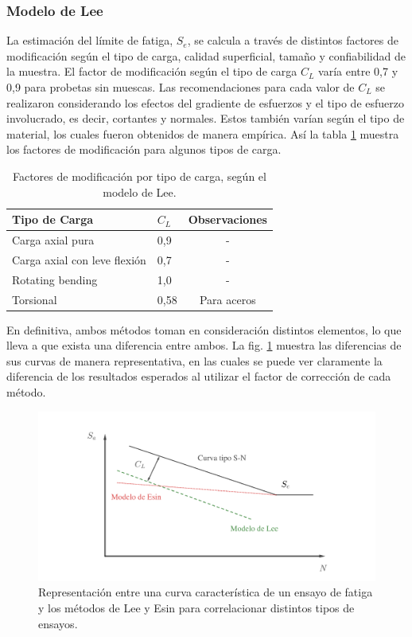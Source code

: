 \subsubsection{Modelo de Lee}
La estimación del límite de fatiga, $S_e$, se calcula a través de distintos factores de modificación según el tipo de carga, calidad superficial, tamaño y confiabilidad de la muestra. El factor de modificación según el tipo de carga $C_L$ varía entre 0,7 y 0,9 para probetas sin muescas. Las recomendaciones para cada valor de $C_L$ se realizaron considerando los efectos del gradiente de esfuerzos y el tipo de esfuerzo involucrado, es decir, cortantes y normales. Estos también varían según el tipo de material, los cuales fueron obtenidos de manera empírica. Así la tabla \ref{tab:lee_factor} muestra los factores de modificación para algunos tipos de carga.

\begin{table}[h]
\centering
\begin{tabular}{@{}llc@{}}
\toprule
Tipo de Carga                & $C_L$ & Observaciones \\ \midrule
Carga axial pura             & 0,9   & -                                 \\
Carga axial con leve flexión & 0,7   & -                                 \\
Rotating bending             & 1,0   & -                                 \\
Torsional                    & 0,58  & Para aceros   \\ \bottomrule
\end{tabular}
\caption{Factores de modificación por tipo de carga, según el modelo de Lee.}
\label{tab:lee_factor}
\end{table}

En definitiva, ambos métodos toman en consideración distintos elementos, lo que lleva a que exista una diferencia entre ambos. La fig. \ref{fig:comp_modfat} muestra las diferencias de sus curvas de manera representativa, en las cuales se puede ver claramente la diferencia de los resultados esperados al utilizar el factor de corrección de cada método.

\begin{figure}[h]
\centering
\includegraphics[width=1\linewidth, trim={6cm 1cm 5cm 2cm}, clip]{Imagenes/comp_modfat.pdf}
\caption{Representación entre una curva característica de un ensayo de fatiga y los métodos de Lee y Esin para correlacionar distintos tipos de ensayos. \cite{strzelecki2018analysis}}
\label{fig:comp_modfat}
\end{figure}


